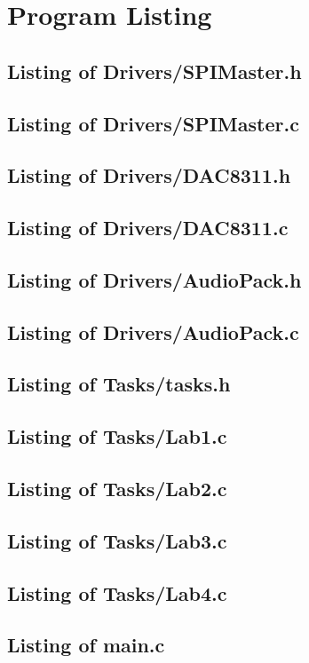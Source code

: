 \documentclass[titlepage]{article}
\begin{document}
\section{Program Listing}
\subsection{Listing of Drivers/SPIMaster.h}

\subsection{Listing of Drivers/SPIMaster.c}

\subsection{Listing of Drivers/DAC8311.h}

\subsection{Listing of Drivers/DAC8311.c}

\subsection{Listing of Drivers/AudioPack.h}

\subsection{Listing of Drivers/AudioPack.c}

\subsection{Listing of Tasks/tasks.h}

\subsection{Listing of Tasks/Lab1.c}

\subsection{Listing of Tasks/Lab2.c}

\subsection{Listing of Tasks/Lab3.c}

\subsection{Listing of Tasks/Lab4.c}

\subsection{Listing of main.c}

\pagebreak
\end{document}
